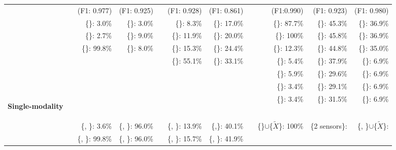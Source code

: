 \begin{table*}[t]
{\begin{tabular}{@{}l c rr c rr c rrr@{}}
&& 
(F1: 0.977)    & 
(F1: 0.925)    && 
(F1: 0.928)    & 
(F1: 0.861)    &&
(F1:0.990)     & 
(F1: 0.923)    & 
(F1: 0.980) \\
\cmidrule{3-4}  \cmidrule{6-7}  \cmidrule{9-11} 
&& 
\{\audio{}\}: 3.0\%       &
\{\audio{}\}: 3.0\%       && 
\{\temperature{}\}: 8.3\%     & 
\{\temperature{}\}: 17.0\%    &&
\{\audio{}\}: 87.7\%     &
\{\audio{}\}: 45.3\%       &
\{\audio{}\}: 36.9\% \\
&& 
\{\bluetooth{}\}: 2.7\%       &
\{\bluetooth{}\}: 9.0\%       && 
\{\gas{}\}: 11.9\%        & 
\{\gas{}\}: 20.0\%        && 
\colorbox{gray!50}{\{\bluetooth{}\}: 100\%}         & 
\colorbox{gray!50}{\{\bluetooth{}\}: 45.8\%} &
\colorbox{gray!50}{\{\bluetooth{}\}: 36.9\%} \\
&& 
\colorbox{gray!20}{\{\wifi{}\}: 99.8\%}       & 
\colorbox{gray!20}{\{\wifi{}\}: 8.0\%}        && 
\{\humidity{}\}: 15.3\%   &
\{\humidity{}\}: 24.4\%   && 
\{\wifi{}\}: 12.3\%    & 
\{\wifi{}\}: 44.8\%   &
\{\wifi{}\}: 35.0\% \\
&&                      
&
&& 
\colorbox{gray!30}{\{\altitude{}\}: 55.1\%}   &
\colorbox{gray!30}{\{\altitude{}\}: 33.1\%}   && 
\{\altitude{}\}: 5.4\%    & 
\{\altitude{}\}: 37.9\%        &
\{\altitude{}\}: 6.9\%\\    
&&                      
& 
&&                      
& 
&& 
\{\gas{}\}: 5.9\%       & 
\{\gas{}\}: 29.6\%      &
\{\gas{}\}: 6.9\%\\    
&&                      
&
&&                      
& 
&& 
\{\humidity{}\}: 3.4\%      &
\{\humidity{}\}: 29.1\%       &
\{\humidity{}\}: 6.9\%\\
\multirow{-3}{*}{\begin{rotate}{90} {\bf Single-modality} \end{rotate}}&&                      
&
&&                      
& 
&& 
\{\temperature{}\}: 3.4\%       &
\{\temperature{}\}: 31.5\%      &
\{\temperature{}\}: 6.9\%\\
\cmidrule{3-4}  \cmidrule{6-7}  \cmidrule{9-11}
&& 
\{\audio{}, \bluetooth{}\}: 3.6\%     &
\{\audio{}, \bluetooth{}\}: 96.0\%    && 
\{\gas{}, \temperature{}\}: 13.9\%    & 
\{\gas{},\temperature{}\}: 40.1\%     && 
\colorbox{gray!70}{\{\bluetooth{}\}$\cup$\{$\widetilde{X}$\}: 100\%}             & 
\{2 sensors\}:                      & 
\{\audio{}, \bluetooth{}\}$\cup$\{$\widetilde{X}$\}: \\
&& 
\{\bluetooth{}, \wifi{}\}: 99.8\%     & 
\{\audio{}, \wifi{}\}: 96.0\%         && 
\{\gas{}, \humidity{}\}: 15.7\%       &  
\{\humidity{}, \temperature{}\}: 41.9\% && 

\end{tabular}}
\end{table*}
